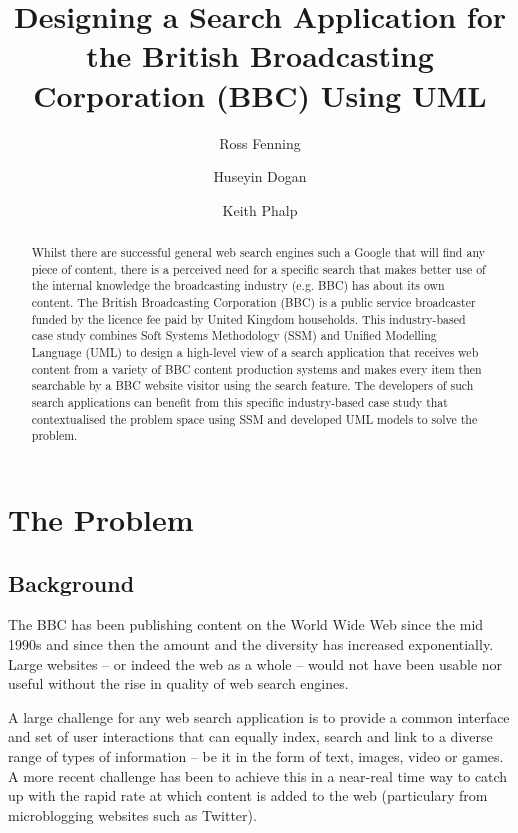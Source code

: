 \documentclass{llncs}
\title{Designing a Search Application for the British Broadcasting Corporation (BBC) Using UML}
\author{Ross Fenning\inst{1}
  \and Huseyin Dogan\inst{2}
  \and Keith Phalp\inst{2}}
\institute{BBC, UK \email{Ross.Fenning@bbc.co.uk}
  \and Bournemouth University, UK \email{\{hdogan,kphalp\}@bournemouth.ac.uk}}
\begin{document}
\maketitle

\begin{abstract}

Whilst there are successful general web search engines such a Google that
will find any piece of content, there is a perceived need for a specific
search that makes better use of the internal knowledge the broadcasting
industry (e.g. BBC) has about its own content. The British Broadcasting
Corporation (BBC) is a public service broadcaster funded by the licence
fee paid by United Kingdom households. This industry-based case study
combines Soft Systems Methodology (SSM) and Unified Modelling Language
(UML) to design a high-level view of a search application that receives
web content from a variety of BBC content production systems and makes
every item then searchable by a BBC website visitor using the search
feature. The developers of such search applications can benefit from this
specific industry-based case study that contextualised the problem space
using SSM and developed UML models to solve the problem.

\end{abstract}

\section{The Problem}

\subsection{Background}

The BBC has been publishing content on the World Wide Web since the
mid 1990s and since then the amount and the diversity has increased
exponentially. Large websites -- or indeed the web as a whole --
would not have been usable nor useful without the rise in quality of
web search engines.

A large challenge for any web search application is to provide a common
interface and set of user interactions that can equally index, search
and link to a diverse range of types of information -- be it in the form
of text, images, video or games. A more recent challenge has been to
achieve this in a near-real time way to catch up with the rapid rate at
which content is added to the web (particulary from microblogging websites
such as Twitter).
\end{document}
